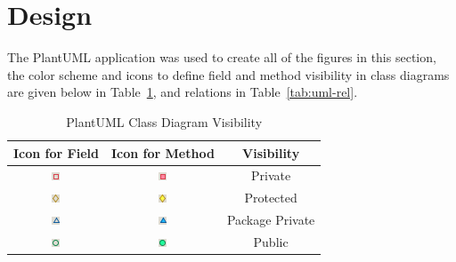 \section{Design}\label{sec:dsg}

  The PlantUML application was used to create all of the figures in this
  section, the color scheme and icons to define field and method visibility
  in class diagrams are given below in Table~\ref{tab:uml-vis}, and
  relations in Table~\ref{tab:uml-rel}.

  \begin{table}[H]
    \centering
    \begin{tabular}{c c c}
      \toprule
      Icon for Field & Icon for Method & Visibility \\ [0.5ex]
      \midrule
      \includegraphics{figures/design/field-private} & \includegraphics{figures/design/method-private} & Private \\
      \includegraphics{figures/design/field-protected} & \includegraphics{figures/design/method-protected} & Protected \\
      \includegraphics{figures/design/field-package-private} & \includegraphics{figures/design/method-package-private} & Package Private \\
      \includegraphics{figures/design/field-public} & \includegraphics{figures/design/method-public} & Public \\
      \bottomrule
    \end{tabular}
    \caption{PlantUML Class Diagram Visibility}\label{tab:uml-vis}
  \end{table}

